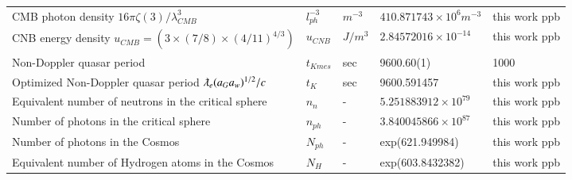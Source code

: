 \documentclass[a4paper,9pt]{article}
\begin{document}
\begin{table}
\begin{tabular}{lllll}
 CMB photon density $16 \pi \zeta (3)/\lambda_{CMB}^3$  & $l_{ph}^{-3}$  & $m^{-3}$   & $410.871743 \times 10^6 m^{-3}$ & this work ppb\\
 
  CNB energy density $u_{CMB} = (3\times (7/8) \times (4/11)^{4/3})$ & $u_{CNB}$ & $J/m^3$ & $2.84572016\times 10^{-14}$ & this work ppb\\
  
  Non-Doppler quasar period & $t_{Kmes}$ & sec & 9600.60(1) & 1000 \\
  
 Optimized Non-Doppler quasar period $\lambdabar_e (a_Ga_w)^{1/2}/c$ & $t_{K}$ & sec & 9600.591457 & this work ppb \\
 
 Equivalent number of neutrons in the critical sphere & $n_n$ & - & $5.251883912 \times 10^{79}$ & this work ppb \\
 
 Number of photons in the critical sphere  & $n_{ph}$ & - & $3.840045866 \times 10^{87}$ & this work ppb \\
 
 Number of photons in the Cosmos  & $N_{ph}$ & - & exp(621.949984) & this work ppb \\
 
 Equivalent number of Hydrogen atoms in the Cosmos  & $N_H$ & - & exp(603.8432382) & this work ppb \\
 \bottomrule
  \end{tabular}
\end{table}
 
\end{document}
